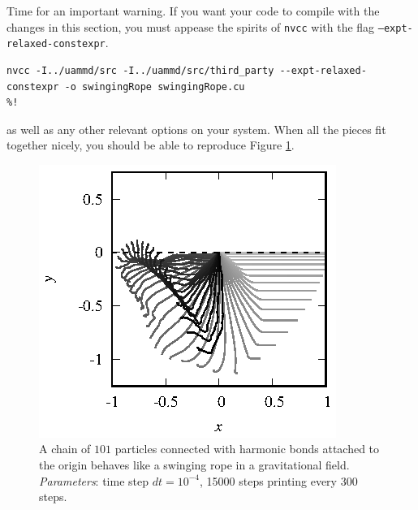 Time for an important warning. If you want your code to compile with the changes
in this section, you must appease the spirits of \texttt{nvcc} with the flag
\texttt{--expt-relaxed-constexpr}.
\begin{lstlisting}
nvcc -I../uammd/src -I../uammd/src/third_party --expt-relaxed-constexpr -o swingingRope swingingRope.cu
%!
\end{lstlisting}
as well as any other relevant options on your system. When all the pieces fit
together nicely, you should be able to reproduce Figure \ref{swingingRope}.

\begin{figure}[t]
  \centering
  \includegraphics[width = 0.6 \textwidth]{figures/swingingRope.eps}
  \caption{\label{swingingRope}A chain of $101$ particles connected with
           harmonic bonds attached to the origin behaves like a swinging rope
           in a gravitational field. \textit{Parameters}: time step
           $dt = 10^{-4}$, 15000 steps printing every 300 steps.}
\end{figure}


